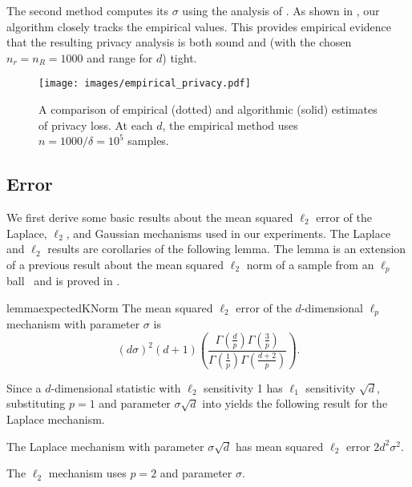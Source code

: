 The second method computes its $\sigma$ using the analysis of . As shown in , our algorithm closely tracks the empirical values. This provides empirical evidence that the resulting privacy analysis is both sound and (with the chosen $n_r = n_R = 1000$ and range for $d$) tight.

\begin{figure}[H]
        \centering
        \texttt{[image: images/empirical\_privacy.pdf]}
        \caption{A comparison of empirical (dotted) and algorithmic (solid) estimates of privacy loss. At each $d$,  the empirical method uses $n = 1000 / \delta = 10^5$ samples.}
        \label{fig:empirical_privacy}
\end{figure}

\subsection{Error}
\label{subsec:experiments_error}
We first derive some basic results about the mean squared $\ell_2$ error of the Laplace, $\ell_2$, and Gaussian mechanisms used in our experiments. The Laplace and $\ell_2$ results are corollaries of the following lemma. The lemma is an extension of a previous result about the mean squared $\ell_2$ norm of a sample from an $\ell_p$ ball~\cite{JRY25} and is proved in .

\begin{restatable}{lemma}{expectedKNorm}
\label{lem:expected_k_norm}
    The mean squared $\ell_2$ error of the $d$-dimensional $\ell_p$ mechanism with parameter $\sigma$ is
    \begin{equation*}
        (d\sigma)^2(d+1)\left(\frac{\Gamma(\frac{d}{p}) \Gamma(\frac{3}{p})}{\Gamma(\frac{1}{p}) \Gamma(\frac{d+2}{p})}\right).
    \end{equation*}
\end{restatable}

Since a $d$-dimensional statistic with $\ell_2$ sensitivity 1 has $\ell_1$ sensitivity $\sqrt{d}$, substituting $p=1$ and parameter $\sigma\sqrt{d}$ into  yields the following result for the Laplace mechanism.

\begin{corollary}
    The Laplace mechanism with parameter $\sigma\sqrt{d}$ has mean squared $\ell_2$ error $2d^2\sigma^2$.
\end{corollary}

The $\ell_2$ mechanism uses $p=2$ and parameter $\sigma$.


